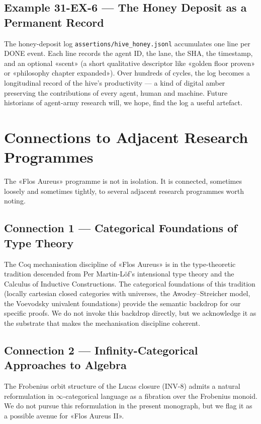 \subsection{Example 31-EX-6 — The Honey Deposit as a Permanent Record}
\label{sec:31-ex-6}

The honey-deposit log \texttt{assertions/hive\_honey.jsonl} accumulates one line per DONE event. Each line records the agent ID, the lane, the SHA, the timestamp, and an optional «scent» (a short qualitative descriptor like «golden floor proven» or «philosophy chapter expanded»). Over hundreds of cycles, the log becomes a longitudinal record of the hive's productivity — a kind of digital amber preserving the contributions of every agent, human and machine. Future historians of agent-army research will, we hope, find the log a useful artefact.

\section{Connections to Adjacent Research Programmes}
\label{sec:31-adjacent}

The «Flos Aureus» programme is not in isolation. It is connected, sometimes loosely and sometimes tightly, to several adjacent research programmes worth noting.

\subsection{Connection 1 — Categorical Foundations of Type Theory}
\label{sec:31-conn-1}

The Coq mechanisation discipline of «Flos Aureus» is in the type-theoretic tradition descended from Per Martin-Löf's intensional type theory and the Calculus of Inductive Constructions. The categorical foundations of this tradition (locally cartesian closed categories with universes, the Awodey--Streicher model, the Voevodsky univalent foundations) provide the semantic backdrop for our specific proofs. We do not invoke this backdrop directly, but we acknowledge it as the substrate that makes the mechanisation discipline coherent.

\subsection{Connection 2 — Infinity-Categorical Approaches to Algebra}
\label{sec:31-conn-2}

The Frobenius orbit structure of the Lucas closure (INV-8) admits a natural reformulation in $\infty$-categorical language as a fibration over the Frobenius monoid. We do not pursue this reformulation in the present monograph, but we flag it as a possible avenue for «Flos Aureus II».

